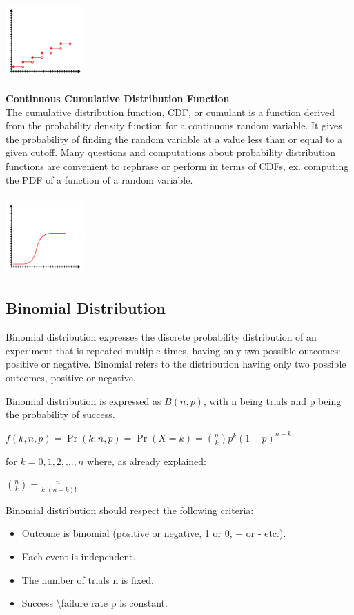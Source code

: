 \documentclass{article}
\begin{document}
\includegraphics[width=3cm, height=3cm]{discrete_cdf}

\textbf{Continuous Cumulative Distribution Function} \\
The cumulative distribution function, CDF, or cumulant is a function derived from the probability density function for a continuous random variable. It gives the probability of finding the random variable at a value less than or equal to a given cutoff. Many questions and computations about probability distribution functions are convenient to rephrase or perform in terms of CDFs, ex. computing the PDF of a function of a random variable.

\includegraphics[width=3cm, height=3cm]{continuos_cdf}

\subsection{Binomial Distribution}
Binomial distribution expresses the discrete probability distribution of an experiment that is repeated multiple times, having only two possible outcomes: positive or negative. 
Binomial refers to the distribution having only two possible outcomes, positive or negative. 

Binomial distribution is expressed as $B(n,p)$, with n being trials and p being the probability of success. 

$ \displaystyle f(k,n,p)=\Pr(k;n,p)=\Pr(X=k)={\binom {n}{k}}p^{k}(1-p)^{n-k}$

for $k = 0, 1, 2, \ldots, n$ where, as already explained:

$ \displaystyle {\binom {n}{k}}={\frac {n!}{k!(n-k)!}}$

Binomial distribution should respect the following criteria:
\begin{itemize}
    \item Outcome is binomial (positive or negative, 1 or 0, + or - etc.).
    \item Each event is independent.
    \item The number of trials n is fixed.
    \item Success \textbackslash failure rate p is constant.
\end{itemize}
\end{document}
